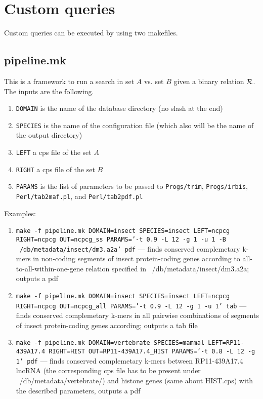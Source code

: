 \documentclass{article}
\begin{document}
\section{Custom queries}
Custom queries can be executed by using two makefiles.
\subsection{pipeline.mk}
This is a framework to run a search in set $A$ vs. set $B$ given a binary relation ${\cal R}$. The inputs are the following.
\begin{enumerate}
\item {\tt DOMAIN} is the name of the database directory (no slash at the end)
\item {\tt SPECIES} is the name of the configuration file (which also will be the name of the output directory)
\item {\tt LEFT}  a cps file of the set $A$
\item {\tt RIGHT} a cps file of the set $B$
\item {\tt PARAMS} is the list of parameters to be passed to {\tt Progs/trim}, {\tt Progs/irbis}, {\tt Perl/tab2maf.pl}, and {\tt Perl/tab2pdf.pl}
\end{enumerate}

Examples:
\begin{enumerate}
\item {\tt make -f pipeline.mk DOMAIN=insect SPECIES=insect LEFT=ncpcg RIGHT=ncpcg OUT=ncpcg\_ss PARAMS='-t 0.9 -L 12 -g 1 -u 1 -B ~/db/metadata/insect/dm3.a2a' pdf} --- finds conserved complemetary k-mers in non-coding segments of insect protein-coding genes according to all-to-all-within-one-gene relation specified in ~/db/metadata/insect/dm3.a2a; outputs a pdf
\item {\tt make -f pipeline.mk DOMAIN=insect SPECIES=insect LEFT=ncpcg RIGHT=ncpcg OUT=ncpcg\_all PARAMS='-t 0.9 -L 12 -g 1 -u 1' tab} --- finds conserved complemetary k-mers in all pairwise combinations of segments of insect protein-coding genes according; outputs a tab file
\item {\tt make -f pipeline.mk DOMAIN=vertebrate SPECIES=mammal LEFT=RP11-439A17.4 RIGHT=HIST OUT=RP11-439A17.4\_HIST PARAMS='-t 0.8 -L 12 -g 1' pdf} --- finds conserved complemetary k-mers between RP11-439A17.4 lncRNA (the corresponding cps file has to be present under ~/db/metadata/vertebrate/) and histone genes (same about HIST.cps) with the described parameters, outputs a pdf
\end{enumerate}
\end{document}
